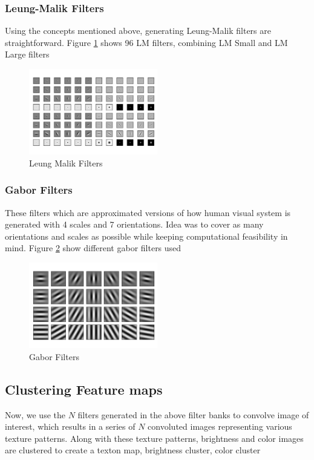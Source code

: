 \documentclass[conference]{IEEEtran}
\begin{document}
		\subsubsection{Leung-Malik Filters}
		Using the concepts mentioned above, generating Leung-Malik filters are straightforward. Figure \ref{fig:LM} shows 96 LM filters, combining LM Small and LM Large filters
		\vspace{0.2cm}
		\begin{figure}[t]
			\centering
			\includegraphics[width=0.5\textwidth]{filter_banks/LM.png}
			\caption{Leung Malik Filters}
			\label{fig:LM}
		\end{figure}
		\subsubsection{Gabor Filters}
		These filters which are approximated versions of how human visual system is generated with 4 scales and 7 orientations. Idea was to cover as many orientations and scales as possible while keeping computational feasibility in mind. Figure \ref{fig:Gabor} show different gabor filters used 
		\begin{figure}
			\centering
			\includegraphics[width=0.5\textwidth]{filter_banks/Gabor.png}
			\caption{Gabor Filters}
			\label{fig:Gabor}
		\end{figure}
		\subsection{Clustering Feature maps}
		Now, we use the $N$ filters generated in the above filter banks to convolve image of interest, which results in a series of $N$ convoluted images representing various texture patterns. Along with these texture patterns, brightness and color images are clustered to create a texton map, brightness cluster, color cluster 
		\vspace{0.2cm}
\end{document}

